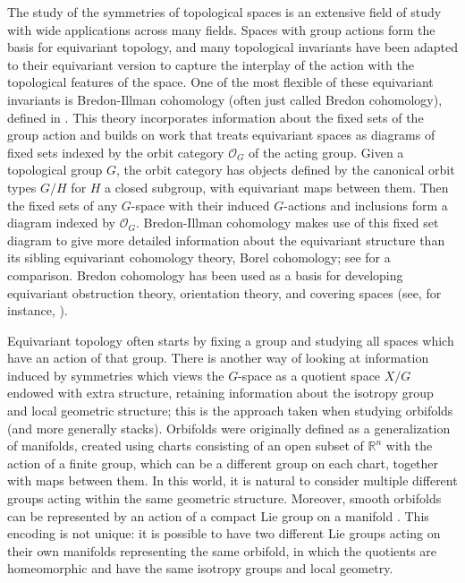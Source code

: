 \documentclass[12pt,reqno]{amsart}
\newcommand{\orbit}{\ensuremath{\mathcal{O}_G}}
\theoremstyle{plain}
\theoremstyle{definition}
\begin{document}
The study of the symmetries of topological spaces is an extensive field of study with wide applications across many fields. Spaces with group actions form the basis for equivariant topology, and many topological invariants have been adapted to their equivariant version to capture the interplay of the action with the topological features of the space.   
 One of the most flexible of these equivariant  invariants is Bredon-Illman cohomology (often just called Bredon cohomology), defined in \cite{bredon:eqvt,illman}.  This theory incorporates information about the fixed sets of the group action and builds on work that treats equivariant spaces as diagrams of fixed sets indexed by the orbit category $\orbit$ of the acting group.
Given a topological group $G$, the orbit category has objects defined by the canonical orbit types $G/H$ for $H$ a closed subgroup, with equivariant maps between them.   Then the fixed sets of any $G$-space with their induced $G$-actions and inclusions form a diagram indexed by $\orbit$. 
 Bredon-Illman cohomology makes use of this fixed set diagram to give    more detailed information about the equivariant structure than its sibling equivariant cohomology theory, Borel cohomology; see \cite[Section IV.2]{may} for a comparison.      Bredon cohomology has been used as a basis for developing equivariant obstruction theory, orientation theory, and covering spaces (see, for instance, \cite{CMW,CW}). 

Equivariant topology often starts by fixing a group and studying all spaces which have an action of that group.   There is another way of looking at information induced by symmetries which views the $G$-space as a quotient space $X/G$ endowed with extra structure,   retaining information about the isotropy group and local geometric structure;  this is the approach taken when studying orbifolds (and more generally stacks).  Orbifolds were originally defined as a generalization of manifolds, created using charts consisting of an open subset of $\mathbb{R}^n$ with the action of a finite group, which can be a different group on each chart, together with maps between them.   In this world, it is natural to consider multiple different groups acting within the same geometric structure. Moreover, smooth orbifolds can  be represented by an  action of a compact Lie group on a manifold \cite{satake}.   This encoding is not unique: it is possible to have two different Lie groups acting on their own manifolds representing the same orbifold, in which the quotients are homeomorphic and have the same isotropy groups and local geometry.   
\end{document}
